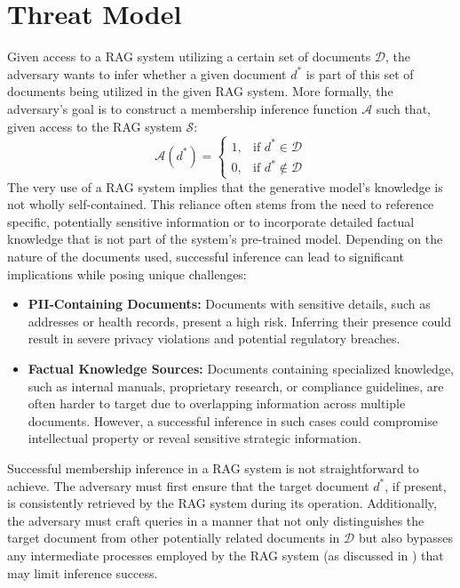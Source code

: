 \section{Threat Model}
\label{sec:threat_model}

 Given access to a RAG system utilizing a certain set of documents \( \mathcal{D} \), the adversary wants to infer whether a given document \( d^* \) is part of this set of documents being utilized in the given RAG system. More formally, the adversary's goal is to construct a membership inference function \( \mathcal{A} \) such that, given access to the RAG system $\mathcal{S}$:
\[
\mathcal{A}(d^*) =
\begin{cases}
1, & \text{if } d^* \in \mathcal{D} \\
0, & \text{if } d^* \notin \mathcal{D}
\end{cases}
\]
The very use of a RAG system implies that the generative model's knowledge is not wholly self-contained. This reliance often stems from the need to reference specific, potentially sensitive information or to incorporate detailed factual knowledge that is not part of the system's pre-trained model. Depending on the nature of the documents used, successful inference can lead to significant implications while posing unique challenges:
\begin{itemize}
    \item \textbf{PII-Containing Documents:} Documents with sensitive details, such as addresses or health records, present a high risk. Inferring their presence could result in severe privacy violations and potential regulatory breaches. 
    \item \textbf{Factual Knowledge Sources:} Documents containing specialized knowledge, such as internal manuals, proprietary research, or compliance guidelines, are often harder to target due to overlapping information across multiple documents. However, a successful inference in such cases could compromise intellectual property or reveal sensitive strategic information.
\end{itemize}
Successful membership inference in a RAG system is not straightforward to achieve. The adversary must first ensure that the target document $d^*$, if present, is consistently retrieved by the RAG system during its operation. Additionally, the adversary must craft queries in a manner that not only distinguishes the target document from other potentially related documents in $\mathcal{D}$ but also bypasses any intermediate processes employed by the RAG system (as discussed in ) that may limit inference success.


